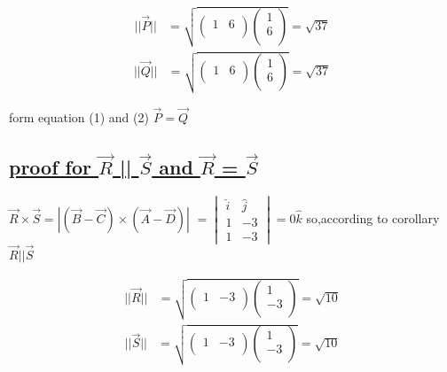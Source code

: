 \documentclass[journal,12pt,twocolumn]{IEEEtran}
\begin{document}
\boldmath
\begin{align}
||{\vec{P}}|| &= \sqrt{\begin{pmatrix}1 & 6 \\ \end{pmatrix}\begin{pmatrix}1 \\ 6 \\ \end{pmatrix}}=\sqrt{37}
\end{align}
\begin{align}
||{\vec{Q}}|| &= \sqrt{\begin{pmatrix}1 & 6 \\ \end{pmatrix}\begin{pmatrix}1 \\ 6 \\ \end{pmatrix}}=\sqrt{37}
\end{align}
\unboldmath


form equation (1) and (2) $\vec{P} = \vec{Q}$

\subsection{\underline{proof for  \textbf{$\vec{R}$} || \textbf{$\vec{S}$} and \textbf{$\vec{R}$} = \textbf{$\vec{S}$}}}
\boldmath
$\vec{R}\times \vec{S}=|(\vec{B}-\vec{C})\times (\vec{A}-\vec{D})|$
$ = \begin{vmatrix}
           \hat{i} & \hat{j}\\
            1 & -3\\
            1 & -3
    \end{vmatrix} = {0\hat{k}}  $
\unboldmath
\vspace{0.3cm}
so,according to corollary $\vec{R} || \vec{S}$

\boldmath
\begin{align}
||{\vec{R}}|| &= \sqrt{\begin{pmatrix}1 & -3 \\ \end{pmatrix}\begin{pmatrix}1 \\ -3 \\ \end{pmatrix}}=\sqrt{10}
\end{align}
\begin{align}
||{\vec{S}}|| &= \sqrt{\begin{pmatrix}1 & -3 \\ \end{pmatrix}\begin{pmatrix}1 \\ -3 \\ \end{pmatrix}}=\sqrt{10}
\end{align}
\unboldmath
\end{document}
